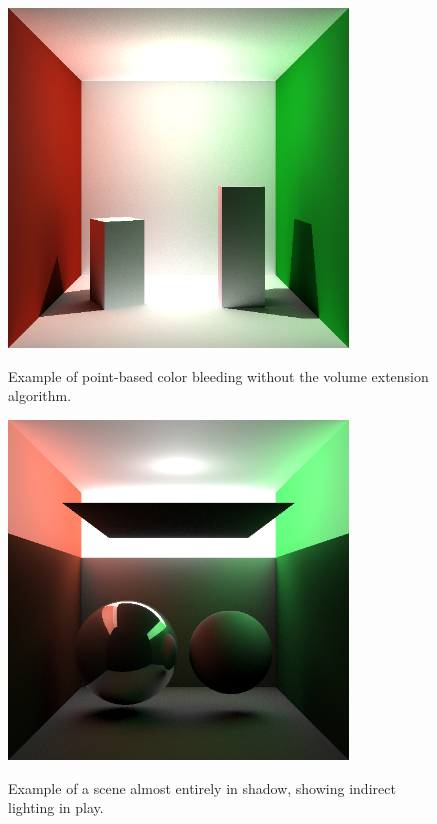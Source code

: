 \documentclass[12pt]{ucthesis}
\newcommand{\captionfonts}{\small\bf\ssp}
\begin{document}
\begin{figure}[h!]
    \centering
    \includegraphics[height=90mm]{img/indirect_box_high.png}
    \captionfonts
    \caption{Example of point-based color bleeding without the volume extension algorithm.}
\end{figure}

\begin{figure}[h!]
    \centering
    \includegraphics[height=90mm]{img/two_sphere_indir.png}
    \captionfonts
    \caption{Example of a scene almost entirely in shadow, showing indirect lighting in play.}
\end{figure}
\end{document}
